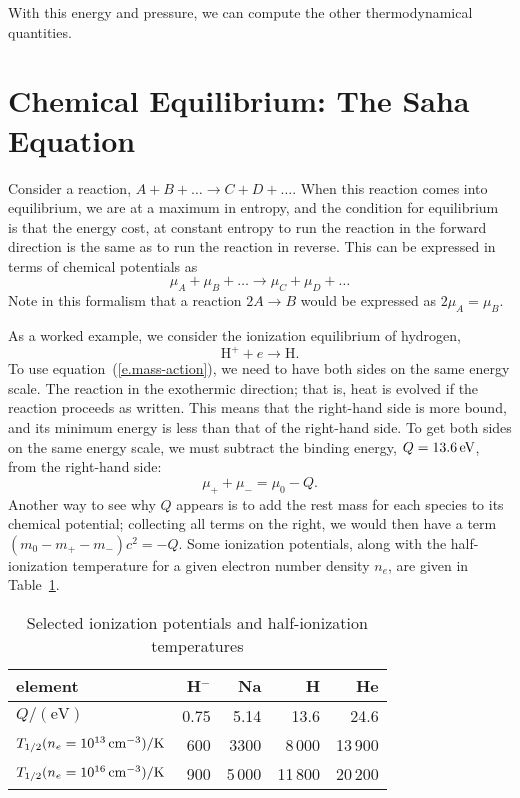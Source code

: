 With this energy and pressure, we can compute the other thermodynamical quantities.  

\section{Chemical Equilibrium: The Saha Equation}

Consider a reaction, $A + B + \ldots \to C + D + \ldots$. When this reaction comes into equilibrium, we are at a maximum in entropy, and the condition for equilibrium is that the energy cost, at constant entropy to run the reaction in the forward direction is the same as to run the reaction in reverse. This can be expressed in terms of chemical potentials as
\begin{equation}\label{e.mass-action}
\mu_{A} + \mu_{B} + \ldots \to \mu_{C} + \mu_{D} + \ldots
\end{equation}
Note in this formalism that a reaction $2A \to B$ would be expressed as $2\mu_{A} = \mu_{B}$.

As a worked example, we consider the ionization equilibrium of hydrogen,
\[ \mathrm{H^{+}} + e \to \mathrm{H}. \]
To use equation~(\ref{e.mass-action}), we need to have both sides on the same energy scale. The reaction in the exothermic direction; that is, heat is evolved if the reaction proceeds as written.  This means that the right-hand side is more bound, and its minimum energy is less than that of the right-hand side. To get both sides on the same energy scale, we must subtract the binding energy, $Q=13.6\,\mathrm{eV}$, from the right-hand side:
\begin{equation}\label{e.ionization-chem-potential}
\mu_{+} + \mu_{-}= \mu_{0} -  Q.
\end{equation}
Another way to see why $Q$ appears is to add the rest mass for each species to its chemical potential; collecting all terms on the right, we would then have a term $(m_{0}-m_{+}-m_{-})c^{2} = -Q$. Some ionization potentials, along with the half-ionization temperature for a given electron number density $n_{e}$, are given in Table~\ref{t.ionization-potentials}.

\begin{table}[htpb]
\begin{center}
\caption{Selected ionization potentials and half-ionization temperatures}\label{t.ionization-potentials}
\begin{tabular}{l|rrrr}
\hline
element & H$^{-}$ & Na & H & He\\
\hline\hline
$Q/(\mathrm{eV})$ & 0.75 & 5.14 & 13.6 & 24.6\\
$T_{1/2}(n_{e} = 10^{13}\,\mathrm{c}\mathrm{m}^{-3})/\mathrm{K}$ & 600 & 3300 & 8\,000 & 13\,900\\
$T_{1/2}(n_{e} = 10^{16}\,\mathrm{c}\mathrm{m}^{-3})/\mathrm{K}$ & 900 & 5\,000 & 11\,800 & 20\,200\\
\hline
\end{tabular}
\end{center}
\end{table}


